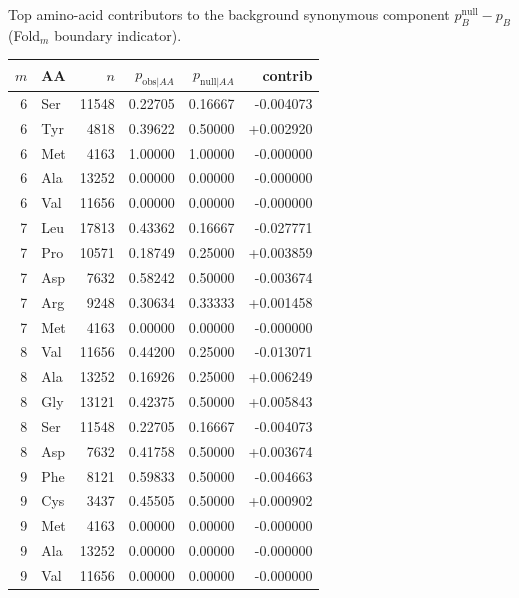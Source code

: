 Top amino-acid contributors to the background synonymous component $p^{\mathrm{null}}_B-p_B$ (Fold$_m$ boundary indicator).

\begingroup
{}
\scriptsize
\setlength{\tabcolsep}{4pt}
\renewcommand{\arraystretch}{1.10}
\setlength{\LTleft}{0pt}
\setlength{\LTright}{0pt}
\begin{longtable}{r l r r r r}
\toprule
$m$ & AA & $n$ & $p_{\mathrm{obs}|AA}$ & $p_{\mathrm{null}|AA}$ & contrib \\
\midrule
6 & Ser & 11548 & 0.22705 & 0.16667 & -0.004073 \\
6 & Tyr & 4818 & 0.39622 & 0.50000 & +0.002920 \\
6 & Met & 4163 & 1.00000 & 1.00000 & -0.000000 \\
6 & Ala & 13252 & 0.00000 & 0.00000 & -0.000000 \\
6 & Val & 11656 & 0.00000 & 0.00000 & -0.000000 \\
7 & Leu & 17813 & 0.43362 & 0.16667 & -0.027771 \\
7 & Pro & 10571 & 0.18749 & 0.25000 & +0.003859 \\
7 & Asp & 7632 & 0.58242 & 0.50000 & -0.003674 \\
7 & Arg & 9248 & 0.30634 & 0.33333 & +0.001458 \\
7 & Met & 4163 & 0.00000 & 0.00000 & -0.000000 \\
8 & Val & 11656 & 0.44200 & 0.25000 & -0.013071 \\
8 & Ala & 13252 & 0.16926 & 0.25000 & +0.006249 \\
8 & Gly & 13121 & 0.42375 & 0.50000 & +0.005843 \\
8 & Ser & 11548 & 0.22705 & 0.16667 & -0.004073 \\
8 & Asp & 7632 & 0.41758 & 0.50000 & +0.003674 \\
9 & Phe & 8121 & 0.59833 & 0.50000 & -0.004663 \\
9 & Cys & 3437 & 0.45505 & 0.50000 & +0.000902 \\
9 & Met & 4163 & 0.00000 & 0.00000 & -0.000000 \\
9 & Ala & 13252 & 0.00000 & 0.00000 & -0.000000 \\
9 & Val & 11656 & 0.00000 & 0.00000 & -0.000000 \\
\bottomrule
\end{longtable}
\endgroup

